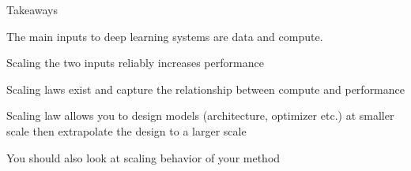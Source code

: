 \documentclass[usenames,dvipsnames,notes,11pt,aspectratio=169,hyperref={colorlinks=true, linkcolor=blue}]{beamer}
\begin{document}
\begin{frame}
    {Takeaways}
    \begin{wideitemize}
        \item The main inputs to deep learning systems are data and compute.
        \item Scaling the two inputs reliably increases performance
        \item Scaling laws exist and capture the relationship between compute and performance
        \item Scaling law allows you to design models (architecture, optimizer etc.) at smaller scale then extrapolate the design to a larger scale
        \item You should also look at scaling behavior of your method 
    \end{wideitemize}
\end{frame}
\end{document}
